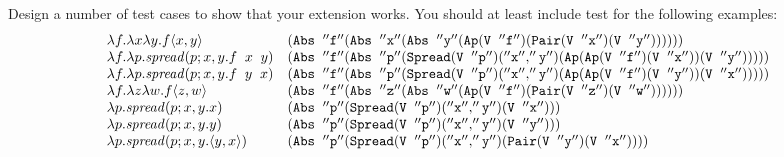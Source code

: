 \documentclass[11pt]{article}
\begin{document}
\begin{exercise}
Design a number of test cases to show that your extension works.  You should at least include test for the following examples:
\[\begin{array}{ll}
\lambda{}f.\lambda{}x\lambda{}y.f{\langle{x,y}\rangle} & {\tt{(Abs \;\;''f'' (Abs \;\;''x'' (Abs \;\;''y'' (Ap (V \;\;''f'') (Pair (V \;\;''x'') (V \;\;''y''))))))}} \\
\lambda{}f.\lambda{}p.{\mathit{spread}({p};{x,y}.{f\;\; x\;\; y})} & {\tt{(Abs \;\;''f'' (Abs \;\;''p'' (Spread (V \;\;''p'') (''x'',''y'') (Ap (Ap (V \;\;''f'') (V \;\;''x''))  (V \;\;''y'')))))}} \\
\lambda{}f.\lambda{}p.{\mathit{spread}({p};{x,y}.{f\;\; y\;\; x})} & {\tt{(Abs \;\;''f'' (Abs \;\;''p'' (Spread (V \;\;''p'') (''x'',''y'') (Ap (Ap (V \;\;''f'') (V \;\;''y''))  (V \;\;''x'')))))}} \\
\lambda{}f.\lambda{}z\lambda{}w.f{\langle{z,w}\rangle}  & {\tt{(Abs \;\;''f'' (Abs \;\;''z'' (Abs \;\;''w'' (Ap  (V \;\;''f'') (Pair (V \;\;''z'') (V \;\;''w''))))))}} \\
\lambda{}p.{\mathit{spread}({p};{x,y}.{x})} & {\tt{(Abs \;\;''p'' (Spread (V \;\;''p'') (''x'',''y'') (V \;\;''x'')))}} \\
\lambda{}p.{\mathit{spread}({p};{x,y}.{y})} & {\tt{(Abs \;\;''p'' (Spread (V \;\;''p'') (''x'',''y'') (V \;\;''y'')))}} \\
\lambda{}p.{\mathit{spread}({p};{x,y}.{{\langle{y,x}\rangle}})} &{\tt{(Abs \;\;''p'' (Spread (V \;\;''p'') (''x'',''y'') (Pair (V \;\;''y'')(V \;\;''x''))))}}\\
\end{array}\]

\end{exercise}
\end{document}
